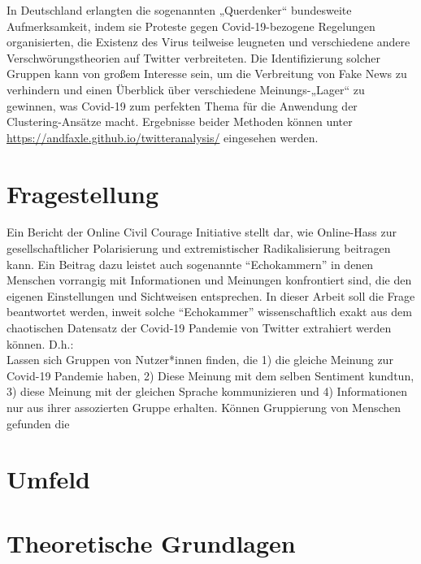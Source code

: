 In Deutschland erlangten die sogenannten „Querdenker“ bundesweite Aufmerksamkeit, indem sie Proteste gegen Covid-19-bezogene Regelungen organisierten, die Existenz des Virus teilweise leugneten und verschiedene andere Verschwörungstheorien auf Twitter verbreiteten.
Die Identifizierung solcher Gruppen kann von großem Interesse sein, um die Verbreitung von Fake News zu verhindern und einen Überblick über verschiedene Meinungs-„Lager“ zu gewinnen, was Covid-19 zum perfekten Thema für die Anwendung der Clustering-Ansätze macht.
Ergebnisse beider Methoden können unter \url{https://andfaxle.github.io/twitteranalysis/} eingesehen werden.

\section{Fragestellung}
\label{sec:fragestellung}
Ein Bericht der Online Civil Courage Initiative stellt dar, wie Online-Hass zur gesellschaftlicher Polarisierung und extremistischer Radikalisierung beitragen kann.
Ein Beitrag dazu leistet auch sogenannte "`Echokammern"' in denen Menschen vorrangig mit Informationen und Meinungen konfrontiert sind, die den eigenen Einstellungen und Sichtweisen entsprechen. \cite{hassrede} In dieser Arbeit soll die Frage beantwortet werden, inweit solche "`Echokammer"' wissenschaftlich exakt aus dem chaotischen Datensatz der Covid-19 Pandemie von Twitter extrahiert werden können. D.h.:\\
Lassen sich Gruppen von Nutzer*innen finden, die 1) die gleiche Meinung zur Covid-19 Pandemie haben, 2) Diese Meinung mit dem selben Sentiment kundtun, 3) diese Meinung mit der gleichen Sprache kommunizieren und 4) Informationen nur aus ihrer assozierten Gruppe erhalten.
Können Gruppierung von Menschen gefunden die 
\section{Umfeld}
\label{sec:umfeld}
\section{Theoretische Grundlagen}
\label{sec:grundlagen}
